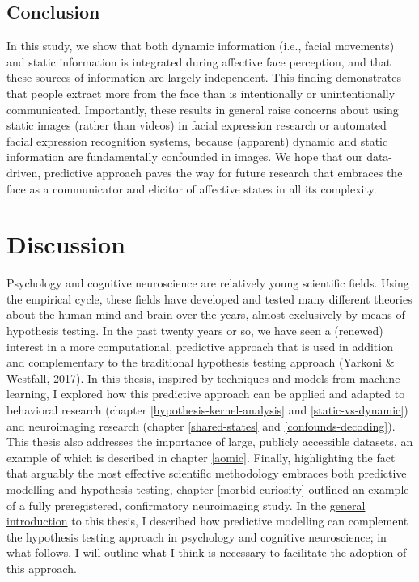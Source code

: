 \documentclass[12pt,american,a4paper,oneside,]{memoir} %
\begin{document}
\hypertarget{svsd-conclusion}{%
\section{Conclusion}\label{svsd-conclusion}}

In this study, we show that both dynamic information (i.e., facial movements) and static information is integrated during affective face perception, and that these sources of information are largely independent. This finding demonstrates that people extract more from the face than is intentionally or unintentionally communicated. Importantly, these results in general raise concerns about using static images (rather than videos) in facial expression research or automated facial expression recognition systems, because (apparent) dynamic and static information are fundamentally confounded in images. We hope that our data-driven, predictive approach paves the way for future research that embraces the face as a communicator and elicitor of affective states in all its complexity.

\hypertarget{general-discussion}{%
\chapter{Discussion}\label{general-discussion}}

Psychology and cognitive neuroscience are relatively young scientific fields. Using the empirical cycle, these fields have developed and tested many different theories about the human mind and brain over the years, almost exclusively by means of hypothesis testing. In the past twenty years or so, we have seen a (renewed) interest in a more computational, predictive approach that is used in addition and complementary to the traditional hypothesis testing approach (Yarkoni \& Westfall, \protect\hyperlink{ref-Yarkoni2017-om}{2017}). In this thesis, inspired by techniques and models from machine learning, I explored how this predictive approach can be applied and adapted to behavioral research (chapter \ref{hypothesis-kernel-analysis} and \ref{static-vs-dynamic}) and neuroimaging research (chapter \ref{shared-states} and \ref{confounds-decoding}). This thesis also addresses the importance of large, publicly accessible datasets, an example of which is described in chapter \ref{aomic}. Finally, highlighting the fact that arguably the most effective scientific methodology embraces both predictive modelling and hypothesis testing, chapter \ref{morbid-curiosity} outlined an example of a fully preregistered, confirmatory neuroimaging study. In the \protect\hyperlink{general-introduction}{general introduction} to this thesis, I described how predictive modelling can complement the hypothesis testing approach in psychology and cognitive neuroscience; in what follows, I will outline what I think is necessary to facilitate the adoption of this approach.
\end{document}
